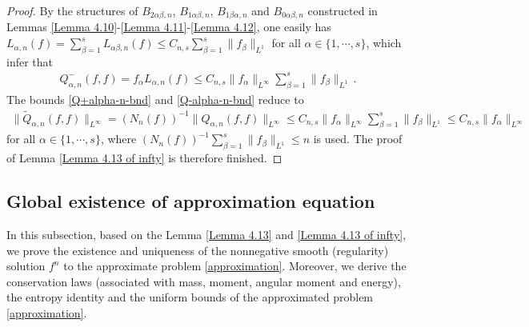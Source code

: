 \documentclass[reqno,11pt]{amsart}
\numberwithin{equation}{section}
\begin{document}
\begin{proof}
By the structures of $B_{2 \alpha \beta, n}$, $B_{1 \alpha \beta, n}$, $B_{1 \beta \alpha, n}$ and $B_{0 \alpha \beta, n}$ constructed in Lemmas \ref{Lemma 4.10}-\ref{Lemma 4.11}-\ref{Lemma 4.12}, one easily has $L_{\alpha, n} (f) = \sum_{\beta = 1}^{s} L_{\alpha \beta, n} (f) \leq C_{n,s} \sum_{\beta = 1}^{s} \| f_\beta \|_{L^1}$ for all $\alpha \in \{ 1, \cdots, s \}$, which infer that
\begin{equation}\label{Q-alpha-n-bnd}
  \begin{aligned}
    Q_{\alpha,n}^- (f, f) = f_\alpha L_{\alpha, n} (f) \leq C_{n,s} \| f_\alpha \|_{L^\infty} \sum_{\beta = 1}^{s} \| f_\beta \|_{L^1} \,.
  \end{aligned}
\end{equation}
The bounds \eqref{Q+alpha-n-bnd} and \eqref{Q-alpha-n-bnd} reduce to
\begin{equation*}
  \begin{aligned}
    \| \tilde{Q}_{\alpha, n} (f, f) \|_{L^\infty} = ( N_n (f) )^{-1} \| Q _{\alpha, n} (f, f) \|_{L^\infty} \leq C_{n,s} \| f_\alpha \|_{L^\infty} \sum_{\beta = 1}^{s} \| f_\beta \|_{L^1} \leq C_{n,s} \| f_\alpha \|_{L^\infty}
  \end{aligned}
\end{equation*}
for all $\alpha \in \{ 1, \cdots, s \}$, where $( N_n (f) )^{-1} \sum_{\beta = 1}^{s} \| f_\beta \|_{L^1} \leq n $ is used. The proof of Lemma \ref{Lemma 4.13 of infty} is therefore finished.
\end{proof}


\subsection{Global existence of approximation equation}

In this subsection, based on the Lemma \ref{Lemma 4.13} and \ref{Lemma 4.13 of infty}, we prove the existence and uniqueness of the nonnegative smooth (regularity) solution $f^n$ to the approximate problem \eqref{approximation}. Moreover, we derive the conservation laws (associated with mass, moment, angular moment and energy), the entropy identity and the uniform bounds of the approximated problem \eqref{approximation}.
\end{document}
